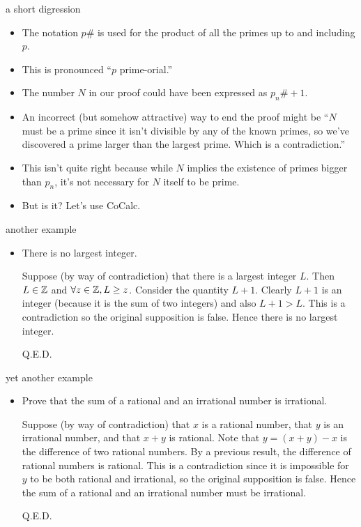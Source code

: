 \documentclass[landscape]{beamer}
\begin{document}
\begin{frame}{a short digression}
\begin{itemize}
\item The notation $p\#$ is used for the product of all the primes up to and including $p$. \pause
\item This is pronounced ``$p$ prime-orial.'' \pause
\item The number $N$ in our proof could have been expressed as $p_n\# + 1$. \pause
\item An incorrect (but somehow attractive) way to end the proof might be ``$N$ must be a prime since it isn't divisible by any of the known primes, so we've discovered a prime larger than the largest prime.  Which is a contradiction.'' \pause
\item This isn't quite right because while $N$ implies the existence of primes bigger than $p_n$, it's not necessary for $N$ itself to be prime. \pause
\item But is it? \pause Let's use CoCalc.
\end{itemize}
\end{frame}

\begin{frame}{another example}
\begin{itemize}
\item  There is no largest integer. \pause


Suppose (by way of contradiction) that there is a largest integer $L$.   
Then $L \in {\mathbb Z}$ and $\forall z \in {\mathbb Z}, L \geq z$.
Consider the quantity $L+1$.  Clearly $L+1$ is an integer (because it is the sum of two integers) and also
$L+1 > L$.   This is a contradiction so the original supposition is false.   Hence there is no largest integer.

\hspace{\fill} Q.E.D.

\end{itemize}
\end{frame}

\begin{frame}{yet another example}
\begin{itemize}
\item  Prove that the sum of a rational and an irrational 
number is irrational.\pause


\noindent Suppose (by way of contradiction) that $x$ is a rational number, that $y$ is an irrational number, and that $x+y$ is rational. 
Note that $y = (x+y) - x$ is the difference of two rational numbers.  By a previous result, the difference of rational numbers is rational.  This is a contradiction since it is impossible for $y$ to be both rational and irrational, so the original supposition is false.   Hence the sum of a rational and an irrational 
number must be irrational.

\hspace{\fill} Q.E.D.


\end{itemize}
\end{frame}
\end{document}
